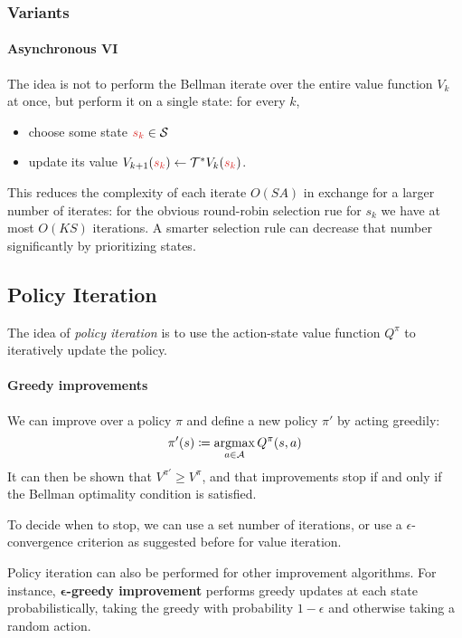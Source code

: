 \documentclass[../course-notes.tex]{subfiles}
\begin{document}
\subsubsection{Variants}

\paragraph{Asynchronous VI} The idea is not to perform the Bellman iterate over the entire value function $V_k$ at once, but perform it on a single state: for every $k$,
\begin{itemize}
	\item choose some state ${\redfont s_k} \in \calS$
	\item update its value $V_{k+1}({\redfont s_k}) \leftarrow \calT^*V_k({\redfont s_k})$.
\end{itemize}
This reduces the complexity of each iterate $O(SA)$ in exchange for a larger number of iterates: for the obvious round-robin selection rue for $s_k$ we have at most $O(KS)$ iterations. A smarter selection rule can decrease that number significantly by prioritizing states.




\subsection{Policy Iteration}

The idea of \textit{policy iteration} is to use the action-state value function $Q^\pi$ to iteratively update the policy.

\paragraph{Greedy improvements} We can improve over a policy $\pi$ and define a new policy $\pi'$ by acting greedily:
\[
	\pi'(s) \coloneqq \operatorname*{\mathrm{argmax}}_{a\in\mathcal{A}} Q^\pi(s,a)
\]
It can then be shown that $V^{\pi'} \geq V^{\pi}$, and that improvements stop if and only if the Bellman optimality condition is satisfied.

To decide when to stop, we can use a set number of iterations, or use a $\epsilon$-convergence criterion as suggested before for value iteration.


Policy iteration can also be performed for other improvement algorithms. For instance, \textbf{$\boldsymbol\epsilon$-greedy improvement} performs greedy updates at each state probabilistically, taking the greedy with probability $1-\epsilon$ and otherwise taking a random action.
\end{document}
